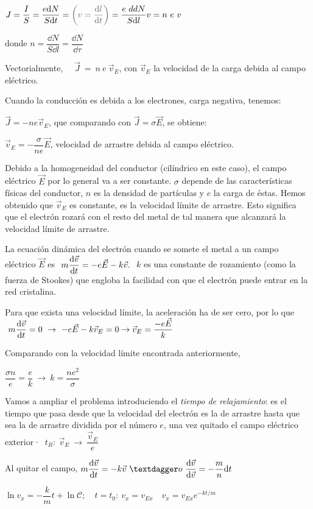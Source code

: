 $\displaystyle J=\dfrac I S = \dfrac {e\dd N}{S \dd t}=\textcolor{gris}{\left( v=\dv{l}{t} \right)}=\dfrac{e\ dd N}{S \dd l}v=n\ e\ v$

donde $n=\dfrac{\dd N}{S \dd l}=\dfrac{\dd N}{\dd \tau}$

Vectorialmente, $\quad \vec J \ = \ n\ e\ \vec v_E$, con $\vec v_E$ la velocidad de la carga debida al campo eléctrico.

Cuando la conducción es debida a los electrones, carga negativa, tenemos:

$\vec J = -ne\vec v_E$, que comparando con $\vec J=\sigma \vec E$, se obtiene:

$\vec v_E=-\dfrac{\sigma}{n e} \vec E$, velocidad de arrastre debida al campo eléctrico.

Debido a la homogeneidad del conductor (cilíndrico en este caso), el campo eléctrico $\vec E$ por lo general va a ser constante. $\sigma$ depende de las características físicas del conductor, $n$ es la densidad de partículas y $e$ la carga de éstas. Hemos obtenido que $\vec v_E$ es constante, es la velocidad límite de arrastre. Esto significa que el electrón rozará con el resto del metal de tal manera que alcanzará la velocidad límite de arrastre.

La ecuación dinámica del electrón cuando se somete el metal a un campo eléctrico $\vec E$ es
$\ \displaystyle m \dv{\vec v}{t}=-e\vec E-k\vec v.\ $ $k$ es una constante de rozamiento (como la fuerza de Stookes) que engloba la facilidad con que el electrón puede entrar en la red cristalina.

Para que exista una velocidad límite, la aceleración ha de ser cero, por lo que $\ \displaystyle m \dv{\vec v}{t}=0 \ \to \ -e\vec E-k\vec v_E=0 \to \vec v_E=\dfrac{-e\vec E}{k}$

Comparando con la velocidad límite encontrada anteriormente, 

$\dfrac{\sigma n}{e}=\dfrac e k \ \to \ k=\dfrac{ne^2}{\sigma}$

Vamos a ampliar el problema introduciendo el \emph{tiempo de relajamiento}: es el tiempo que pasa desde que la velocidad del electrón es la de arrastre hasta que sea la de arrastre dividida por el número $e$, una vez quitado el campo eléctrico exterior· $\ t_R:\ \vec v_E \ \to \ \dfrac{\vec v_E}{e}$

Al quitar el campo, $\displaystyle m\dv{\vec v}{t}=-k\vec v \ †o \ \dv{\vec v}{\vec v}=-\dfrac m n \dd t$

$\ln v_x=-\dfrac k m t + \ln \mathcal C;\quad t=t_0:\ v_x=v_{Ex} \quad v_x=v_{Ex}e^{-kt/m}$

